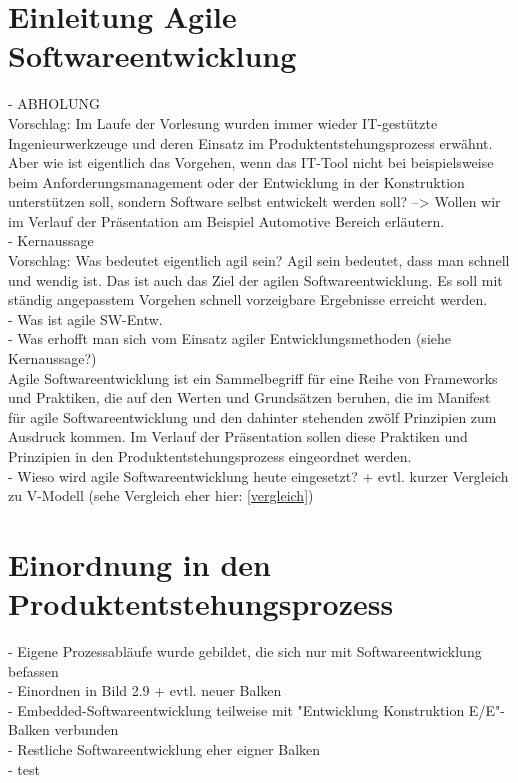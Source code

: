 \section{Einleitung Agile Softwareentwicklung}
- ABHOLUNG\\
Vorschlag: Im Laufe der Vorlesung wurden immer wieder IT-gestützte Ingenieurwerkzeuge und deren Einsatz im Produktentstehungsprozess erwähnt. \cite{Daberkow2022} Aber wie ist eigentlich das Vorgehen, wenn das IT-Tool nicht bei beispielsweise beim Anforderungsmanagement oder der Entwicklung in der Konstruktion unterstützen soll, sondern Software selbst entwickelt werden soll? --> Wollen wir im Verlauf der Präsentation am Beispiel Automotive Bereich erläutern. \\
- Kernaussage\\
Vorschlag: Was bedeutet eigentlich agil sein? Agil sein bedeutet, dass man schnell und wendig ist. Das ist auch das Ziel der agilen Softwareentwicklung. Es soll mit ständig angepasstem Vorgehen schnell vorzeigbare Ergebnisse erreicht werden. \cite{wolf2011agile}\\
- Was ist agile SW-Entw.\\
- Was erhofft man sich vom Einsatz agiler Entwicklungsmethoden (siehe Kernaussage?)\\
\glqq Agile Softwareentwicklung ist ein Sammelbegriff für eine Reihe von Frameworks und Praktiken, die auf den Werten und Grundsätzen beruhen, die im Manifest für agile Softwareentwicklung und den dahinter stehenden zwölf Prinzipien zum Ausdruck kommen.\grqq  \cite{agile101} Im Verlauf der Präsentation sollen diese Praktiken und Prinzipien in den Produktentstehungsprozess eingeordnet werden. \\
- Wieso wird agile Softwareentwicklung heute eingesetzt? + evtl. kurzer Vergleich zu V-Modell (sehe Vergleich eher hier: \ref{vergleich})\\ 

\section{Einordnung in den Produktentstehungsprozess}
- Eigene Prozessabläufe wurde gebildet, die sich nur mit Softwareentwicklung befassen\\
- Einordnen in Bild 2.9 + evtl. neuer Balken\\
- Embedded-Softwareentwicklung teilweise mit "Entwicklung Konstruktion E/E"-Balken verbunden\\
- Restliche Softwareentwicklung eher eigner Balken\\
- test
